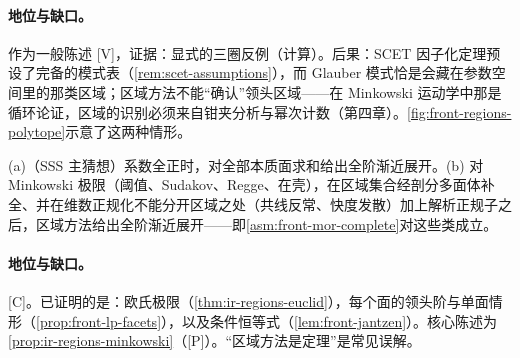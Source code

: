 \paragraph{地位与缺口。}作为一般陈述 [V]，证据：显式的三圈反例（计算）。后果：SCET 因子化定理预设了完备的模式表（\cref{rem:scet-assumptions}），而 Glauber 模式恰是会藏在参数空间里的那类区域；区域方法不能“确认”领头区域——在 Minkowski 运动学中那是循环论证，区域的识别必须来自钳夹分析与幂次计数（第四章）。\cref{fig:front-regions-polytope}示意了这两种情形。


\begin{conjecture}\label{conj:front-mor-minkowski}
(a)（SSS 主猜想\cite{Semenova:2018cwy}）系数全正时，对全部本质面求和给出全阶渐近展开。(b) 对 Minkowski 极限（阈值、Sudakov、Regge、在壳），在区域集合经剖分多面体补全、并在维数正规化不能分开区域之处（共线反常、快度发散）加上解析正规子之后，区域方法给出全阶渐近展开——即\cref{asm:front-mor-complete}对这些类成立。
\end{conjecture}

\paragraph{地位与缺口。}[C]。已证明的是：欧氏极限（\cref{thm:ir-regions-euclid}），每个面的领头阶与单面情形（\cref{prop:front-lp-facets}），以及条件恒等式（\cref{lem:front-jantzen}）。核心陈述为\cref{prop:ir-regions-minkowski}（[P]）。“区域方法是定理”是常见误解。

